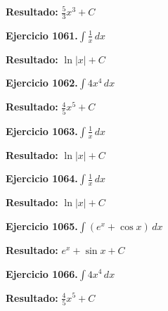\documentclass[10pt,a4paper]{article}
\begin{document}
\begin{solbox}
\textbf{Resultado:} \(\displaystyle \frac{5}{3}x^{3} + C\)
\end{solbox}

\begin{ejbox}
\textbf{Ejercicio 1061.}\quad $\int \frac{1}{x}\,dx$
\end{ejbox}

\begin{solbox}
\textbf{Resultado:} \(\displaystyle \ln|x| + C\)
\end{solbox}

\begin{ejbox}
\textbf{Ejercicio 1062.}\quad $\int 4x^{4}\,dx$
\end{ejbox}

\begin{solbox}
\textbf{Resultado:} \(\displaystyle \frac{4}{5}x^{5} + C\)
\end{solbox}

\newpage
\begin{ejbox}
\textbf{Ejercicio 1063.}\quad $\int \frac{1}{x}\,dx$
\end{ejbox}

\begin{solbox}
\textbf{Resultado:} \(\displaystyle \ln|x| + C\)
\end{solbox}

\begin{ejbox}
\textbf{Ejercicio 1064.}\quad $\int \frac{1}{x}\,dx$
\end{ejbox}

\begin{solbox}
\textbf{Resultado:} \(\displaystyle \ln|x| + C\)
\end{solbox}

\begin{ejbox}
\textbf{Ejercicio 1065.}\quad $\int (e^x + \cos x)\,dx$
\end{ejbox}

\begin{solbox}
\textbf{Resultado:} \(\displaystyle e^x + \sin x + C\)
\end{solbox}

\newpage
\begin{ejbox}
\textbf{Ejercicio 1066.}\quad $\int 4x^{4}\,dx$
\end{ejbox}

\begin{solbox}
\textbf{Resultado:} \(\displaystyle \frac{4}{5}x^{5} + C\)
\end{solbox}
\end{document}
